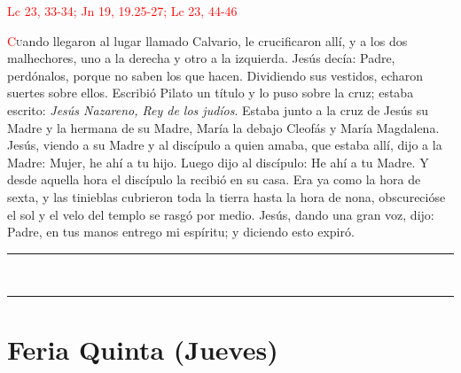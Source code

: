 \documentclass[10pt,twoside]{book}
\begin{document}
\vspace{-0.5em}

\hfill\textcolor{red}{Lc 23, 33-34; Jn 19, 19.25-27; Lc 23, 44-46}

\lettrine[lines=2]{\textcolor{red}{C}}uando llegaron al lugar llamado Calvario, le crucificaron allí, y a los dos malhechores, uno a la derecha y otro a la izquierda. 
Jesús decía: Padre, perdónalos, porque no saben los que hacen. Dividiendo sus vestidos, echaron suertes sobre ellos. Escribió Pilato un título y lo puso sobre la cruz;
estaba escrito: \textit{Jesús Nazareno, Rey de los judíos}. Estaba junto a la cruz de Jesús su Madre y la hermana de su Madre, María la debajo Cleofás y María Magdalena.
Jesús, viendo a su Madre y al discípulo a quien amaba, que estaba allí, dijo a la Madre: Mujer, he ahí a tu hijo. Luego dijo al discípulo: He ahí a tu Madre.
Y desde aquella hora el discípulo la recibió en su casa. Era ya como la hora de sexta, y las tinieblas cubrieron toda la tierra hasta la hora de nona,
obscurecióse el sol y el velo del templo se rasgó por medio. Jesús, dando una gran voz, dijo: Padre, en tus manos entrego mi espíritu; y diciendo esto expiró.

\vspace{0.5em}

{}

\iralfinal

\vspace{0.5em}

\begin{center}
      \begin{spacing}{0.25}
            {\rule{20em}{0.4pt}}\\
            {\rule{20em}{0.4pt}}
      \end{spacing}
\end{center}


\section*{\centering Feria Quinta (Jueves)}
\end{document}
